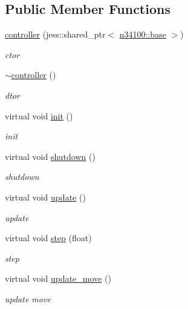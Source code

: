 \subsection*{Public Member Functions}
\begin{DoxyCompactItemize}
\item 
\hyperlink{classnebula_1_1content_1_1actor_1_1physics_1_1controller_a1342ed6f004a13a9d1c9f611e222894b}{controller} (jess::shared\_\-ptr$<$ \hyperlink{classnebula_1_1content_1_1actor_1_1admin_1_1base}{n34100::base} $>$)
\begin{DoxyCompactList}\small\item\em ctor \item\end{DoxyCompactList}\item 
\hyperlink{classnebula_1_1content_1_1actor_1_1physics_1_1controller_ae2e6459aa8fafd45c7a1f18a1906d418}{$\sim$controller} ()
\begin{DoxyCompactList}\small\item\em dtor \item\end{DoxyCompactList}\item 
virtual void \hyperlink{classnebula_1_1content_1_1actor_1_1physics_1_1controller_adcc26e24dd15484de04d73b0043cda75}{init} ()
\begin{DoxyCompactList}\small\item\em init \item\end{DoxyCompactList}\item 
virtual void \hyperlink{classnebula_1_1content_1_1actor_1_1physics_1_1controller_a826208e0d0b4cdcf52882b4eab3bd361}{shutdown} ()
\begin{DoxyCompactList}\small\item\em shutdown \item\end{DoxyCompactList}\item 
virtual void \hyperlink{classnebula_1_1content_1_1actor_1_1physics_1_1controller_abda74fc66665e489ae6364efd1eb7e30}{update} ()
\begin{DoxyCompactList}\small\item\em update \item\end{DoxyCompactList}\item 
virtual void \hyperlink{classnebula_1_1content_1_1actor_1_1physics_1_1controller_a76e049f3e302ed369ed9d2820487cc3e}{step} (float)
\begin{DoxyCompactList}\small\item\em step \item\end{DoxyCompactList}\item 
virtual void \hyperlink{classnebula_1_1content_1_1actor_1_1physics_1_1controller_ad2a4afb425a1aade9cbdd8ae8da99f47}{update\_\-move} ()
\begin{DoxyCompactList}\small\item\em update move \item\end{DoxyCompactList}\end{DoxyCompactItemize}
